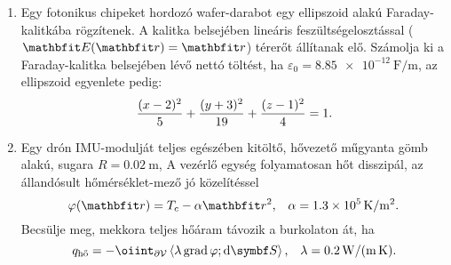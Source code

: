 \documentclass{szb-practice}
\begin{document}
\begin{enumerate}
  \item Egy fotonikus chipeket hordozó wafer-darabot egy ellipszoid alakú
        Faraday-kalitkába rögzítenek. A kalitka belsejében lineáris
        feszültségelosztással ($\rvec E(\coordv) = \coordv$) térerőt állítanak
        elő. Számolja ki a Faraday-kalitka belsejében lévő nettó töltést, ha
        $\varepsilon_0 = \SI[per-mode=symbol]{8,85e-12}{\farad\per\meter}$,
        az ellipszoid egyenlete pedig:
        $$
          \frac{(x - 2)^2}{5} + \frac{(y + 3)^2}{19} + \frac{(z - 1)^2}{4} = 1
          \text.
        $$

  \item Egy drón IMU-modulját teljes egészében kitöltő, hővezető műgyanta gömb
        alakú, sugara $R = \SI{0.02}{\meter}$, A vezérlő egység folyamatosan
        hőt disszipál, az állandósult hő\-mér\-sék\-let-mező jó közelítéssel
        $$
          \varphi(\coordv) = T_c - \alpha \rvec r^2
          \text, \quad
          \alpha = \SI[per-mode=symbol]{1,3e5}{\kelvin\per\meter\squared}
          \text.
        $$
        Becsülje meg, mekkora teljes hőáram távozik a burkolaton át, ha
        $$
          q_{\text{hő}}
          = - \oiint_{\partial \volimage} \scalar{\lambda \grad \varphi}{\dd \surfvec}
          \text,\quad
          \lambda = \SI[per-mode=symbol]{0,2}{\watt\per\meter\per\kelvin}
          \text.
        $$
\end{enumerate}
\end{document}
